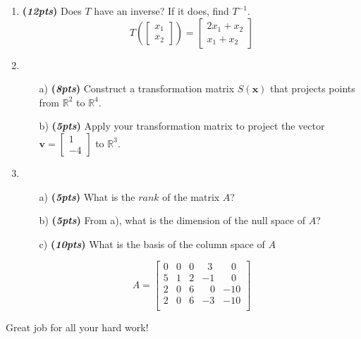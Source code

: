 \documentclass[12pt]{article}%
\begin{document}
\begin{enumerate}
    
    \item \textbf{(\emph{12pts})} Does \(T\) have an inverse?
    If it does, find \(T^{-1}\).
    \[
    T\left( \begin{bmatrix} x_1\\x_2\end{bmatrix} \right) = 
    \begin{bmatrix} 2x_1 + x_2 \\ x_1 + x_2\end{bmatrix}
    \]
    
    
    
    \vspace{7cm}
    

    \item \begin{itemize}
        \item[a)] \textbf{(\emph{8pts})} Construct a transformation matrix \(S(\mathbf{x})\) that projects points from \(\mathbb{R}^2\) to \(\mathbb{R}^4\).
        \vspace{2cm}
        \item[b)] \textbf{(\emph{5pts})} Apply your transformation matrix to project the vector \(\mathbf{v}=\begin{bmatrix}
            1\\-4
        \end{bmatrix}\) to \(\mathbb{R}^3\).
    \end{itemize}
    \vspace{3cm}


    
    
    
    \item
    \begin{itemize}
        \item[a)]\textbf{(\emph{5pts})} What is the \(rank\) of the matrix \(A\)?
        \item[b)]\textbf{(\emph{5pts})} From a), what is the dimension of the null space of \(A\)?
        \item[c)]\textbf{(\emph{10pts})} What is the basis of the column space of \(A\)
    \end{itemize} 
    \[
    A = \begin{bmatrix}
    0 & 0 & 0 & \;\;3 & \;\;\;0 \\
        5 & 1 & 2 & -1  & \;\;\;0 \\
        2 & 0 & 6 & \;\;\;0 & -10 \\
        2 & 0 & 6 & -3 & -10 \\
    \end{bmatrix}
    \]

     
  
    
\end{enumerate}

\vspace{12.5cm}

\begin{center}
    Great job for all your hard work!
\end{center}
\end{document}
